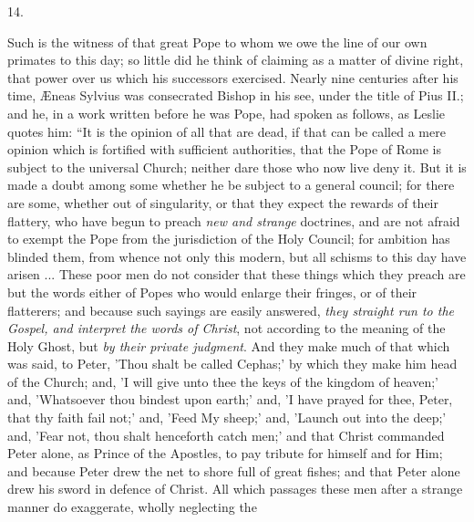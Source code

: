 14.

Such is the witness of that great Pope to whom we owe the line of
our own primates to this day; so little did he think of claiming as a
matter of divine right, that power over us which his successors
exercised. Nearly nine centuries after his time, Æneas Sylvius was
consecrated Bishop in his see, under the title of Pius II.; and he, in
a work written before he was Pope, had spoken as follows, as Leslie
quotes him: ``It is the opinion of all that are dead, if that can
be called a mere opinion which is fortified with sufficient
authorities, that the Pope of Rome is subject to the universal Church;
neither dare those who now live deny it. But it is made a doubt among
some whether he be subject to a general council; for there are some,
whether out of singularity, or that they expect the rewards of their
flattery, who have begun to preach \emph{new and strange} doctrines,
and are not afraid to exempt the Pope from the jurisdiction of the
Holy Council; for ambition has blinded them, from whence not
only this modern, but all schisms to this day have arisen ... These
poor men do not consider that these things which they preach are but
the words either of Popes who would enlarge their fringes, or of their
flatterers; and because such sayings are easily answered, \emph{they
straight run to the Gospel, and interpret the words of Christ}, not
according to the meaning of the Holy Ghost, but \emph{by their private
judgment}. And they make much of that which was said, to Peter,
'Thou shalt be called Cephas;' by which they make him head of the
Church; and, 'I will give unto thee the keys of the kingdom of
heaven;' and, 'Whatsoever thou bindest upon earth;' and, 'I have
prayed for thee, Peter, that thy faith fail not;' and, 'Feed My
sheep;' and, 'Launch out into the deep;' and, 'Fear not, thou shalt
henceforth catch men;' and that Christ commanded Peter alone, as
Prince of the Apostles, to pay tribute for himself and for Him; and
because Peter drew the net to shore full of great fishes; and that
Peter alone drew his sword in defence of Christ. All which passages
these men after a strange manner do exaggerate, wholly neglecting the

